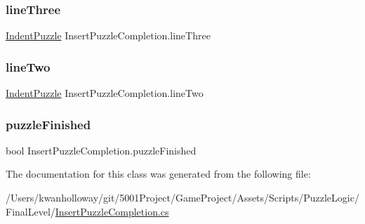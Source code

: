 \subsubsection{\texorpdfstring{line\+Three}{lineThree}}
{\footnotesize\ttfamily \hyperlink{class_indent_puzzle}{Indent\+Puzzle} Insert\+Puzzle\+Completion.\+line\+Three}

\mbox{\label{class_insert_puzzle_completion_a90e3355e28d38eed7b71ab656607af65}} 
\subsubsection{\texorpdfstring{line\+Two}{lineTwo}}
{\footnotesize\ttfamily \hyperlink{class_indent_puzzle}{Indent\+Puzzle} Insert\+Puzzle\+Completion.\+line\+Two}

\mbox{\label{class_insert_puzzle_completion_a6184f335f81f3b544e6b065a9cccc084}} 
\subsubsection{\texorpdfstring{puzzle\+Finished}{puzzleFinished}}
{\footnotesize\ttfamily bool Insert\+Puzzle\+Completion.\+puzzle\+Finished}



The documentation for this class was generated from the following file\+:\begin{DoxyCompactItemize}
\item 
/\+Users/kwanholloway/git/5001\+Project/\+Game\+Project/\+Assets/\+Scripts/\+Puzzle\+Logic/\+Final\+Level/\hyperlink{_insert_puzzle_completion_8cs}{Insert\+Puzzle\+Completion.\+cs}\end{DoxyCompactItemize}
